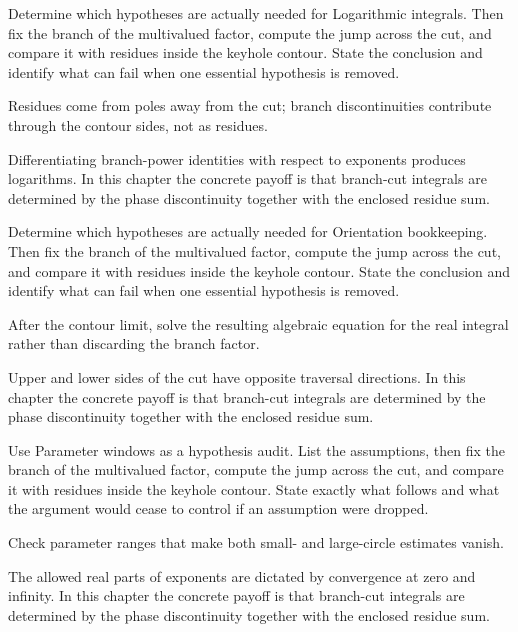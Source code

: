 \begin{exercise}\label{exr:iv21-06}
Determine which hypotheses are actually needed for Logarithmic integrals. Then fix the branch of the multivalued factor, compute the jump across the cut, and compare it with residues inside the keyhole contour. State the conclusion and identify what can fail when one essential hypothesis is removed.
\end{exercise}
\begin{hint}
Residues come from poles away from the cut; branch discontinuities contribute through the contour sides, not as residues.
\end{hint}
\begin{solution}
Differentiating branch-power identities with respect to exponents produces logarithms. In this chapter the concrete payoff is that branch-cut integrals are determined by the phase discontinuity together with the enclosed residue sum.
\end{solution}

\begin{exercise}\label{exr:iv21-07}
Determine which hypotheses are actually needed for Orientation bookkeeping. Then fix the branch of the multivalued factor, compute the jump across the cut, and compare it with residues inside the keyhole contour. State the conclusion and identify what can fail when one essential hypothesis is removed.
\end{exercise}
\begin{hint}
After the contour limit, solve the resulting algebraic equation for the real integral rather than discarding the branch factor.
\end{hint}
\begin{solution}
Upper and lower sides of the cut have opposite traversal directions. In this chapter the concrete payoff is that branch-cut integrals are determined by the phase discontinuity together with the enclosed residue sum.
\end{solution}

\begin{exercise}\label{exr:iv21-08}
Use Parameter windows as a hypothesis audit. List the assumptions, then fix the branch of the multivalued factor, compute the jump across the cut, and compare it with residues inside the keyhole contour. State exactly what follows and what the argument would cease to control if an assumption were dropped.
\end{exercise}
\begin{hint}
Check parameter ranges that make both small- and large-circle estimates vanish.
\end{hint}
\begin{solution}
The allowed real parts of exponents are dictated by convergence at zero and infinity. In this chapter the concrete payoff is that branch-cut integrals are determined by the phase discontinuity together with the enclosed residue sum.
\end{solution}

